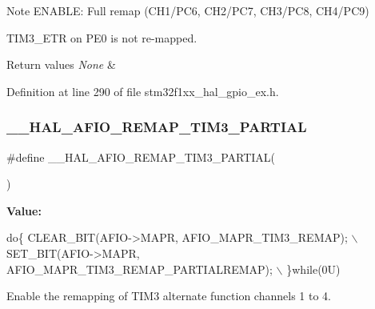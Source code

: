 \begin{DoxyNote}{Note}
E\+N\+A\+B\+LE\+: Full remap (C\+H1/\+P\+C6, C\+H2/\+P\+C7, C\+H3/\+P\+C8, C\+H4/\+P\+C9) 

T\+I\+M3\+\_\+\+E\+TR on P\+E0 is not re-\/mapped. 
\end{DoxyNote}

\begin{DoxyRetVals}{Return values}
{\em None} & \\
\hline
\end{DoxyRetVals}


Definition at line 290 of file stm32f1xx\+\_\+hal\+\_\+gpio\+\_\+ex.\+h.

\mbox{\label{group___g_p_i_o_ex___a_f_i_o___a_f___r_e_m_a_p_p_i_n_g_ga207839eb8e1b063b22c2e579faec4183}} 
\subsubsection{\texorpdfstring{\+\_\+\+\_\+\+H\+A\+L\+\_\+\+A\+F\+I\+O\+\_\+\+R\+E\+M\+A\+P\+\_\+\+T\+I\+M3\+\_\+\+P\+A\+R\+T\+I\+AL}{\_\_HAL\_AFIO\_REMAP\_TIM3\_PARTIAL}}
{\footnotesize\ttfamily \#define \+\_\+\+\_\+\+H\+A\+L\+\_\+\+A\+F\+I\+O\+\_\+\+R\+E\+M\+A\+P\+\_\+\+T\+I\+M3\+\_\+\+P\+A\+R\+T\+I\+AL(\begin{DoxyParamCaption}{ }\end{DoxyParamCaption})}

{\bfseries Value\+:}
\begin{DoxyCode}
\textcolor{keywordflow}{do}\{ CLEAR\_BIT(AFIO->MAPR, AFIO\_MAPR\_TIM3\_REMAP);            \(\backslash\)
                                               SET\_BIT(AFIO->MAPR, AFIO\_MAPR\_TIM3\_REMAP\_PARTIALREMAP); \(\backslash\)
                                             \}\textcolor{keywordflow}{while}(0U)
\end{DoxyCode}


Enable the remapping of T\+I\+M3 alternate function channels 1 to 4. 

